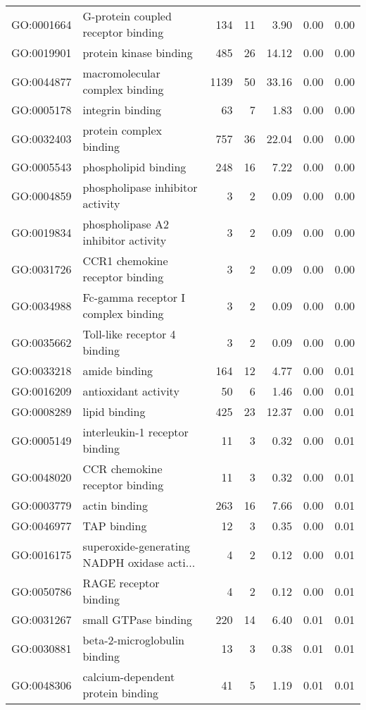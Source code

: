 \begin{table}[ht]
\begin{tabular}{llrrrrr}
  GO:0001664 & G-protein coupled receptor binding & 134 &  11 & 3.90 & 0.00 & 0.00 \\ 
  GO:0019901 & protein kinase binding & 485 &  26 & 14.12 & 0.00 & 0.00 \\ 
  GO:0044877 & macromolecular complex binding & 1139 &  50 & 33.16 & 0.00 & 0.00 \\ 
  GO:0005178 & integrin binding &  63 &   7 & 1.83 & 0.00 & 0.00 \\ 
  GO:0032403 & protein complex binding & 757 &  36 & 22.04 & 0.00 & 0.00 \\ 
  GO:0005543 & phospholipid binding & 248 &  16 & 7.22 & 0.00 & 0.00 \\ 
  GO:0004859 & phospholipase inhibitor activity &   3 &   2 & 0.09 & 0.00 & 0.00 \\ 
  GO:0019834 & phospholipase A2 inhibitor activity &   3 &   2 & 0.09 & 0.00 & 0.00 \\ 
  GO:0031726 & CCR1 chemokine receptor binding &   3 &   2 & 0.09 & 0.00 & 0.00 \\ 
  GO:0034988 & Fc-gamma receptor I complex binding &   3 &   2 & 0.09 & 0.00 & 0.00 \\ 
  GO:0035662 & Toll-like receptor 4 binding &   3 &   2 & 0.09 & 0.00 & 0.00 \\ 
  GO:0033218 & amide binding & 164 &  12 & 4.77 & 0.00 & 0.01 \\ 
  GO:0016209 & antioxidant activity &  50 &   6 & 1.46 & 0.00 & 0.01 \\ 
  GO:0008289 & lipid binding & 425 &  23 & 12.37 & 0.00 & 0.01 \\ 
  GO:0005149 & interleukin-1 receptor binding &  11 &   3 & 0.32 & 0.00 & 0.01 \\ 
  GO:0048020 & CCR chemokine receptor binding &  11 &   3 & 0.32 & 0.00 & 0.01 \\ 
  GO:0003779 & actin binding & 263 &  16 & 7.66 & 0.00 & 0.01 \\ 
  GO:0046977 & TAP binding &  12 &   3 & 0.35 & 0.00 & 0.01 \\ 
  GO:0016175 & superoxide-generating NADPH oxidase acti... &   4 &   2 & 0.12 & 0.00 & 0.01 \\ 
  GO:0050786 & RAGE receptor binding &   4 &   2 & 0.12 & 0.00 & 0.01 \\ 
  GO:0031267 & small GTPase binding & 220 &  14 & 6.40 & 0.01 & 0.01 \\ 
  GO:0030881 & beta-2-microglobulin binding &  13 &   3 & 0.38 & 0.01 & 0.01 \\ 
  GO:0048306 & calcium-dependent protein binding &  41 &   5 & 1.19 & 0.01 & 0.01 \\ 

\end{tabular}
\end{table}
